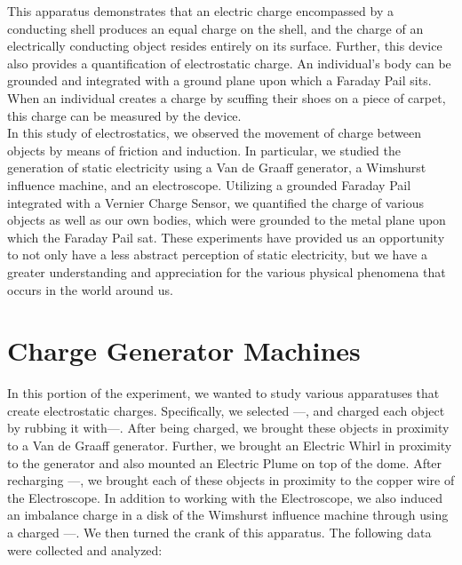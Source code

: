 \documentclass[12pt]{amsart}
\begin{document}
\indent This apparatus demonstrates that an electric charge encompassed by a conducting shell produces an equal charge on the shell, and the charge of an electrically conducting object resides entirely on its surface. Further, this device also provides a quantification of electrostatic charge. An individual’s body can be grounded and integrated with a ground plane upon which a Faraday Pail sits. When an individual creates a charge by scuffing their shoes on a piece of carpet, this charge can be measured by the device.\\

\indent In this study of electrostatics, we observed the movement of charge between objects by means of friction and induction. In particular, we studied the generation of static electricity using a Van de Graaff generator, a Wimshurst influence machine, and an electroscope. Utilizing a grounded Faraday Pail integrated with a Vernier Charge Sensor, we quantified the charge of various objects as well as our own bodies, which were grounded to the metal plane upon which the Faraday Pail sat. These experiments have provided us an opportunity to not only have a less abstract perception of static electricity, but we have a greater understanding and appreciation for the various physical phenomena that occurs in the world around us.

\section{Charge Generator Machines} 
\indent In this portion of the experiment, we wanted to study various apparatuses that create electrostatic charges. Specifically, we selected ---, and charged each object by rubbing it with---. After being charged, we brought these objects in proximity to a Van de Graaff generator. Further, we brought an Electric Whirl in proximity to the generator and also mounted an Electric Plume on top of the dome. After recharging ---, we brought each of these objects in proximity to the copper wire of the Electroscope. In addition to working with the Electroscope, we also induced an imbalance charge in a disk of the Wimshurst influence machine through using a charged ---. We then turned the crank of this apparatus. The following data were collected and analyzed: 
\end{document}
